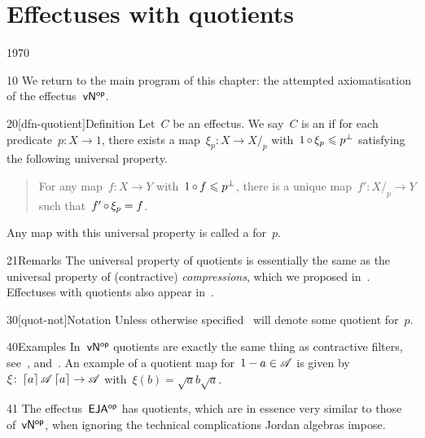 \section{Effectuses with quotients}
\begin{parsec}{1970}%
\begin{point}{10}%
    We return to the main program
        of this chapter: the attempted axiomatisation
        of the effectus~${\mathsf{vN}}{^{\mathsf{op}}}$.
\end{point}
\begin{point}{20}[dfn-quotient]{Definition}%
Let~$C$ be an effectus.
We say~$C$ is an 
    if for each predicate~$p \colon X \to 1$,
    there exists a map~$\xi_p \colon X \to X/_p$
    with~$1 \mathop{\circ} \xi_p \leqslant p^\perp$
    satisfying the following universal property.
\begin{quote}
    For any map~$f\colon X \to Y$
        with~$1 \mathop{\circ} f \leqslant p^\perp$,
        there is a unique map~$f' \colon X/_p \to Y$
        such that~$f' \mathop{\circ} \xi_p = f$.
\end{quote}
Any  map with this universal property
    is called a  for~$p$.
\begin{point}{21}{Remarks}%
The universal property of quotients
    is essentially the same as
    the universal property of (contractive) \emph{compressions},
    which we proposed in~\cite{westerbaan2016universal}.
Effectuses with quotients also appear in~\cite{effintro}.
\end{point}
\begin{point}{30}[quot-not]{Notation}%
    Unless otherwise specified~
    will denote some quotient for~$p$.
\end{point}
\end{point}
\begin{point}{40}{Examples}%
In~${\mathsf{vN}}{^{\mathsf{op}}}$ quotients are exactly the same thing
    as contractive filters,
    see~, 
    and~.
An example of a quotient map for~$1-a \in \mathscr{A}$ is given
    by~$\xi\colon \left\lceil a\right\rceil\mathscr{A} \left\lceil a\right\rceil \to \mathscr{A}$
    with~$\xi(b) = \sqrt{a} b \sqrt{a}$.
\begin{point}{41}%
The effectus~${\mathsf{EJA}}{^{\mathsf{op}}}$ has quotients,
    which are in essence very similar to those of~${\mathsf{vN}}{^{\mathsf{op}}}$,
    when ignoring the technical complications Jordan algebras
    impose. \cite[prop.~25]{eja}
\end{point}

\end{point}
\end{parsec}
